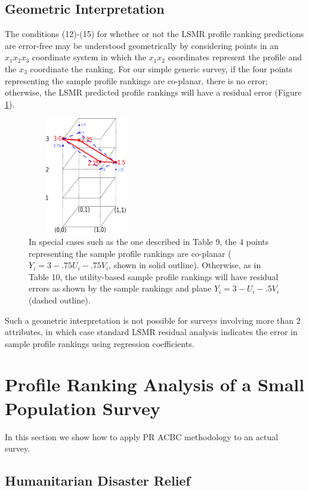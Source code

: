 \documentclass[a4paper, 12pt]{article}
\begin{document}
\subsection{Geometric Interpretation}

The conditions  (12)-(15) for whether or not the LSMR  profile ranking predictions are error-free may be understood geometrically by considering points in an $x_1x_2x_3$ coordinate system in which the $x_1x_2$ coordinates represent the profile and the $x_3$ coordinate the ranking. For our simple generic survey,  if the four points representing the sample profile rankings are co-planar, there is no error; otherwise, the LSMR predicted profile rankings will have a residual error (Figure  \ref{sec4fig}).


 \begin{figure}[!htpb]
	\centering
\includegraphics[width=2in,height=2in]{sec4fig.eps}
\caption{{\small In special cases such  as the one described in Table 9, the 4 points representing the sample profile rankings are co-planar ($Y_i=3-.75U_i-.75V_i$, shown in solid outline). Otherwise, as in Table 10, the utility-based sample profile rankings will have residual errors as shown by the sample rankings and plane  $Y_i=3-U_i-.5V_i$ (dashed outline). }}	
 \label{sec4fig}
\end{figure}

{\flushleft Such a} geometric interpretation  is not possible for surveys involving more than 2 attributes, in which case standard LSMR residual analysis indicates the error in sample  profile rankings using regression coefficients.


\section{Profile Ranking Analysis of a Small Population Survey}

In this section we show how to apply PR ACBC methodology to an actual survey. 

\subsection{Humanitarian Disaster Relief}
\end{document}
